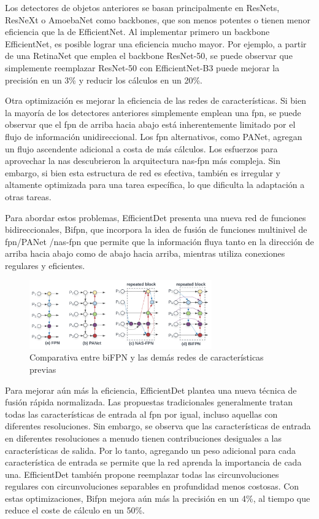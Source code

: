 Los detectores de objetos anteriores se basan principalmente en ResNets, ResNeXt o AmoebaNet como backbones, que son menos potentes o tienen menor eficiencia que la de EfficientNet. Al implementar primero un backbone EfficientNet, es posible lograr una eficiencia mucho mayor. Por ejemplo, a partir de una RetinaNet que emplea el backbone ResNet-50, se puede observar que simplemente reemplazar ResNet-50 con EfficientNet-B3 puede mejorar la precisión en un 3\% y reducir los cálculos en un 20\%.

Otra optimización es mejorar la eficiencia de las redes de características. Si bien la mayoría de los detectores anteriores simplemente emplean una \gls{fpn}, se puede observar que el \gls{fpn} de arriba hacia abajo está inherentemente limitado por el flujo de información unidireccional. Los \gls{fpn} alternativos, como PANet, agregan un flujo ascendente adicional a costa de más cálculos. Los esfuerzos para aprovechar la \gls{nas} descubrieron la arquitectura \gls{nas}-\gls{fpn} más compleja. Sin embargo, si bien esta estructura de red es efectiva, también es irregular y altamente optimizada para una tarea específica, lo que dificulta la adaptación a otras tareas.

Para abordar estos problemas, EfficientDet presenta una nueva red de funciones bidireccionales, Bi\gls{fpn}, que incorpora la idea de fusión de funciones multinivel de \gls{fpn}/PANet /\gls{nas}-\gls{fpn} que permite que la información fluya tanto en la dirección de arriba hacia abajo como de abajo hacia arriba, mientras utiliza conexiones regulares y eficientes.

\begin{figure}[ht]
\centering
\includegraphics[width=0.7\textwidth]{img/chapters/estado-del-arte/comparativa_fpn+panet+nas-fpn+bifpn.png}
\caption{\label{fig:comparativa-bifpn}Comparativa entre biFPN y las demás redes de características previas \cite{tan2020efficientdet}}
\end{figure}

Para mejorar aún más la eficiencia, EfficientDet plantea una nueva técnica de fusión rápida normalizada. Las propuestas tradicionales generalmente tratan todas las características de entrada al \gls{fpn} por igual, incluso aquellas con diferentes resoluciones. Sin embargo, se observa que las características de entrada en diferentes resoluciones a menudo tienen contribuciones desiguales a las características de salida. Por lo tanto, agregando un peso adicional para cada característica de entrada se permite que la red aprenda la importancia de cada una. EfficientDet también propone reemplazar todas las circunvoluciones regulares con circunvoluciones separables en profundidad menos costosas. Con estas optimizaciones, Bi\gls{fpn} mejora aún más la precisión en un 4\%, al tiempo que reduce el coste de cálculo en un 50\%.

